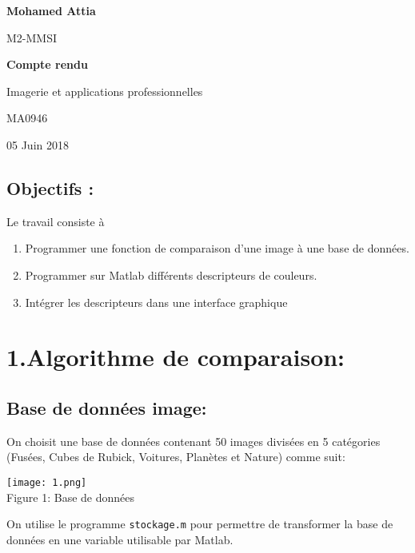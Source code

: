 \documentclass[12pt,a4paper,notitlepage]{report}
\begin{document}
\begin{large}
\textbf{Mohamed Attia}

M2-MMSI
\end{large}

\begin{center}
\begin{huge}
\vspace{8cm}
\textbf{Compte rendu }\\

\vspace{1cm}

Imagerie et applications professionnelles
\end{huge}

\begin{LARGE}

\vspace{0.5cm} MA0946
\end{LARGE}

\vspace{8cm}
\begin{large}
05 Juin 2018

\end{large}
\end{center}

\newpage
\subsection*{Objectifs :}
Le travail consiste à 
\begin{enumerate}
\item Programmer une fonction de comparaison d'une image à une base de données. 
\item Programmer sur Matlab différents descripteurs de couleurs.
\item Intégrer les descripteurs dans une interface graphique
\end{enumerate}

\section*{1.Algorithme de comparaison:}
\subsection*{Base de données image:}
On choisit une base de données contenant 50 images divisées en 5 catégories (Fusées, Cubes de Rubick, Voitures, Planètes et Nature) comme suit:

\begin{center}
\texttt{[image: 1.png]}\\
Figure 1: Base de données
\end{center}
On utilise le programme \texttt{stockage.m} pour permettre de transformer la base de données en une variable utilisable par Matlab.
\end{document}
